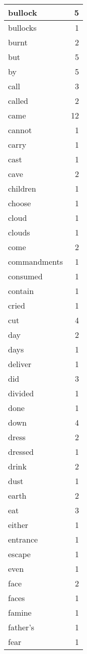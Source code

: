 \begin{center}
\begin{longtable}{l|r}
bullock & 5\\ \hline 
bullocks & 1\\ \hline 
burnt & 2\\ \hline 
but & 5\\ \hline 
by & 5\\ \hline 
call & 3\\ \hline 
called & 2\\ \hline 
came & 12\\ \hline 
cannot & 1\\ \hline 
carry & 1\\ \hline 
cast & 1\\ \hline 
cave & 2\\ \hline 
children & 1\\ \hline 
choose & 1\\ \hline 
cloud & 1\\ \hline 
clouds & 1\\ \hline 
come & 2\\ \hline 
commandments & 1\\ \hline 
consumed & 1\\ \hline 
contain & 1\\ \hline 
cried & 1\\ \hline 
cut & 4\\ \hline 
day & 2\\ \hline 
days & 1\\ \hline 
deliver & 1\\ \hline 
did & 3\\ \hline 
divided & 1\\ \hline 
done & 1\\ \hline 
down & 4\\ \hline 
dress & 2\\ \hline 
dressed & 1\\ \hline 
drink & 2\\ \hline 
dust & 1\\ \hline 
earth & 2\\ \hline 
eat & 3\\ \hline 
either & 1\\ \hline 
entrance & 1\\ \hline 
escape & 1\\ \hline 
even & 1\\ \hline 
face & 2\\ \hline 
faces & 1\\ \hline 
famine & 1\\ \hline 
father's & 1\\ \hline 
fear & 1\\ \hline 

\end{longtable}
\end{center}
